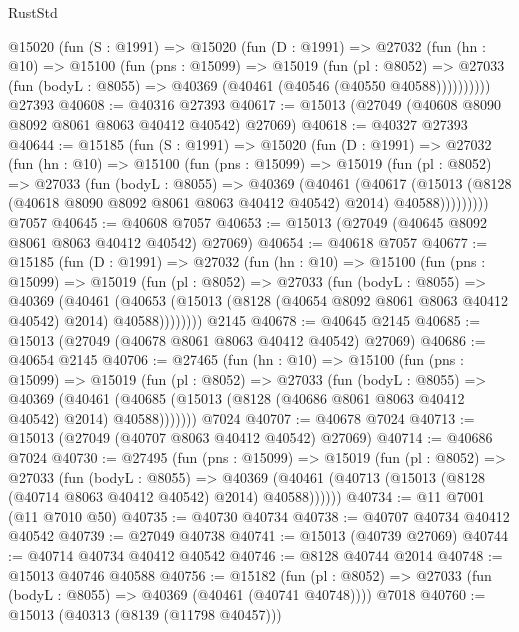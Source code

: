 \begin{lexlean}{RustStd}
\begin{coremodule}
    @15020
      (fun (S : @1991) =>
      @15020
        (fun (D : @1991) =>
        @27032
          (fun (hn : @10) =>
          @15100
            (fun (pns : @15099) =>
            @15019
              (fun (pl : @8052) =>
              @27033 (fun (bodyL : @8055) => @40369 (@40461 (@40546 (@40550 @40588))))))))))
    @27393
@40608 := @40316 @27393
@40617 := @15013 (@27049 (@40608 @8090 @8092 @8061 @8063 @40412 @40542) @27069)
@40618 := @40327 @27393
@40644 := @15185
    (fun (S : @1991) =>
    @15020
      (fun (D : @1991) =>
      @27032
        (fun (hn : @10) =>
        @15100
          (fun (pns : @15099) =>
          @15019
            (fun (pl : @8052) =>
            @27033
              (fun (bodyL : @8055) =>
              @40369
                (@40461
                  (@40617
                    (@15013
                      (@8128 (@40618 @8090 @8092 @8061 @8063 @40412 @40542) @2014)
                      @40588)))))))))
    @7057
@40645 := @40608 @7057
@40653 := @15013 (@27049 (@40645 @8092 @8061 @8063 @40412 @40542) @27069)
@40654 := @40618 @7057
@40677 := @15185
    (fun (D : @1991) =>
    @27032
      (fun (hn : @10) =>
      @15100
        (fun (pns : @15099) =>
        @15019
          (fun (pl : @8052) =>
          @27033
            (fun (bodyL : @8055) =>
            @40369
              (@40461
                (@40653
                  (@15013 (@8128 (@40654 @8092 @8061 @8063 @40412 @40542) @2014) @40588))))))))
    @2145
@40678 := @40645 @2145
@40685 := @15013 (@27049 (@40678 @8061 @8063 @40412 @40542) @27069)
@40686 := @40654 @2145
@40706 := @27465
    (fun (hn : @10) =>
    @15100
      (fun (pns : @15099) =>
      @15019
        (fun (pl : @8052) =>
        @27033
          (fun (bodyL : @8055) =>
          @40369
            (@40461 (@40685 (@15013 (@8128 (@40686 @8061 @8063 @40412 @40542) @2014) @40588)))))))
    @7024
@40707 := @40678 @7024
@40713 := @15013 (@27049 (@40707 @8063 @40412 @40542) @27069)
@40714 := @40686 @7024
@40730 := @27495
    (fun (pns : @15099) =>
    @15019
      (fun (pl : @8052) =>
      @27033
        (fun (bodyL : @8055) =>
        @40369 (@40461 (@40713 (@15013 (@8128 (@40714 @8063 @40412 @40542) @2014) @40588))))))
@40734 := @11 @7001 (@11 @7010 @50)
@40735 := @40730 @40734
@40738 := @40707 @40734 @40412 @40542
@40739 := @27049 @40738
@40741 := @15013 (@40739 @27069)
@40744 := @40714 @40734 @40412 @40542
@40746 := @8128 @40744 @2014
@40748 := @15013 @40746 @40588
@40756 := @15182
    (fun (pl : @8052) => @27033 (fun (bodyL : @8055) => @40369 (@40461 (@40741 @40748))))
    @7018
@40760 := @15013 (@40313 (@8139 (@11798 @40457)))

\end{coremodule}
\end{lexlean}
